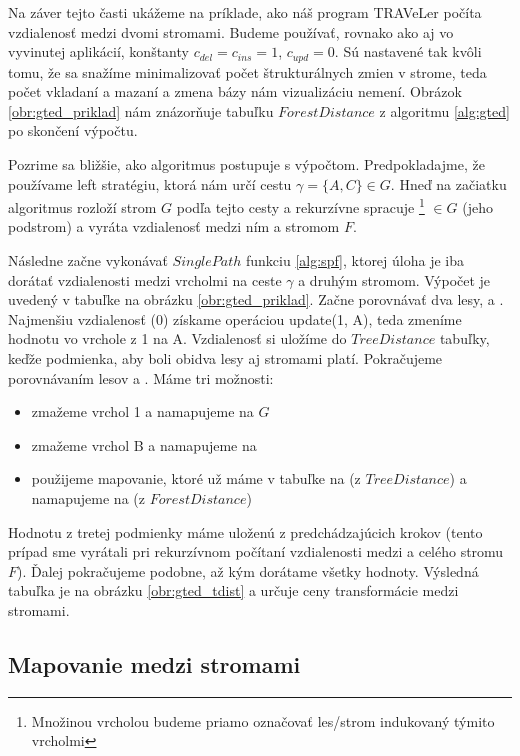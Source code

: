 Na záver tejto časti ukážeme na príklade, ako náš program TRAVeLer počíta vzdialenosť
medzi dvomi stromami. Budeme používať, rovnako ako aj vo vyvinutej aplikácií,
konštanty $c_{del} = c_{ins} = 1$, $c_{upd} = 0$. Sú nastavené tak
kvôli tomu, že sa snažíme minimalizovať počet štrukturálnych zmien v strome, teda
počet vkladaní a mazaní a zmena bázy nám vizualizáciu nemení.
Obrázok \ref{obr:gted_priklad} nám znázorňuje tabuľku $ForestDistance$ z algoritmu
\ref{alg:gted} po skončení výpočtu.

Pozrime sa bližšie, ako algoritmus postupuje s výpočtom. Predpokladajme, že
používame left stratégiu, ktorá nám určí cestu $\gamma = \{A, C\} \in G$.
Hneď na začiatku algoritmus rozloží strom $G$ podľa tejto cesty a rekurzívne
spracuje \footnote{Množinou vrcholou budeme priamo označovať les/strom
indukovaný týmito vrcholmi} $\in G$ (jeho podstrom) a vyráta vzdialenosť medzi ním a stromom $F$.



Následne začne vykonávať $SinglePath$ funkciu \ref{alg:spf}, ktorej úloha je iba dorátať
vzdialenosti medzi vrcholmi na ceste $\gamma$ a druhým stromom.
Výpočet je uvedený v tabuľke na obrázku \ref{obr:gted_priklad}.
Začne porovnávať dva lesy,  a . Najmenšiu vzdialenosť (0) získame operáciou
update(1, A), teda zmeníme hodnotu vo vrchole z 1 na A. Vzdialenosť si uložíme do $TreeDistance$
tabuľky, keďže podmienka, aby boli obidva lesy aj stromami platí.
Pokračujeme porovnávaním lesov  a .
Máme tri možnosti:
\begin{itemize}
  \item zmažeme vrchol 1 a namapujeme \set{} na $G$
  \item zmažeme vrchol B a namapujeme  na 
  \item použijeme mapovanie, ktoré už máme v tabuľke  na  (z $TreeDistance$)
    a namapujeme \set{} na  (z $ForestDistance$)
\end{itemize}
Hodnotu z tretej podmienky máme uloženú z predchádzajúcich krokov (tento prípad sme vyrátali
pri rekurzívnom počítaní vzdialenosti medzi  a celého stromu $F$).
Ďalej pokračujeme podobne, až kým dorátame všetky hodnoty.
Výsledná tabuľka je na obrázku \ref{obr:gted_tdist} a určuje ceny transformácie
medzi stromami.






\subsection{Mapovanie medzi stromami}

